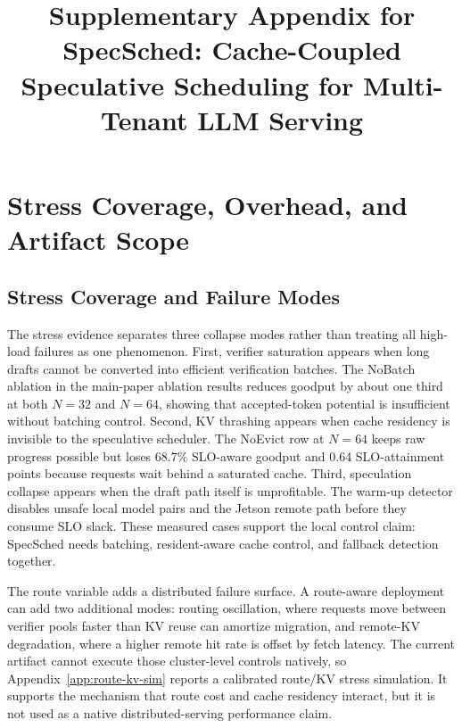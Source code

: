 \documentclass[10pt,journal,onecolumn]{IEEEtran}
\newcommand{\system}{SpecSched}
\begin{document}
\title{Supplementary Appendix for \\ SpecSched: Cache-Coupled Speculative Scheduling for Multi-Tenant LLM Serving}
\author{}
\maketitle
\appendices

\section{Stress Coverage, Overhead, and Artifact Scope}
\label{app:stress-overhead-artifact}

\subsection{Stress Coverage and Failure Modes}
\label{sec:stress-failure}

The stress evidence separates three collapse modes rather than treating
all high-load failures as one phenomenon. First, verifier saturation
appears when long drafts cannot be converted into efficient verification
batches. The NoBatch ablation in the main-paper ablation results reduces
goodput by about one third at both $N=32$ and $N=64$, showing that
accepted-token potential is insufficient without batching control.
Second, KV thrashing appears when cache residency is invisible to the
speculative scheduler. The NoEvict row at $N=64$ keeps raw progress
possible but loses 68.7\% SLO-aware goodput and 0.64 SLO-attainment
points because requests wait behind a saturated cache. Third,
speculation collapse appears when the draft path itself is
unprofitable. The warm-up detector disables unsafe local model pairs and
the Jetson remote path before they consume SLO slack. These measured
cases support the local control claim: \system{} needs batching,
resident-aware cache control, and fallback detection together.

The route variable adds a distributed failure surface. A route-aware
deployment can add two additional modes: routing oscillation, where
requests move between verifier pools faster than KV reuse can amortize
migration, and remote-KV degradation, where a higher remote hit rate is
offset by fetch latency. The current artifact cannot execute those
cluster-level controls natively, so Appendix~\ref{app:route-kv-sim}
reports a calibrated route/KV stress simulation. It supports the
mechanism that route cost and cache residency interact, but it is not
used as a native distributed-serving performance claim.
\end{document}
